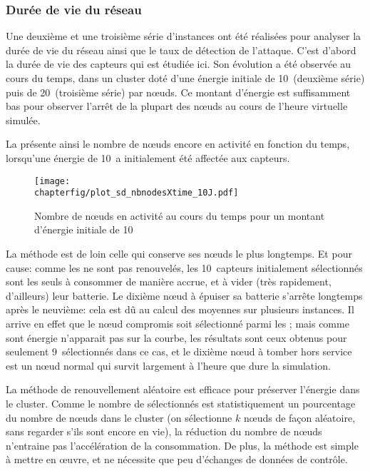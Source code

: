         \subsubsection{Durée de vie du réseau}
Une deuxième et une troisième série d'instances ont été réalisées pour analyser la durée de vie du réseau ainsi que le taux de détection de l'attaque.
C'est d'abord la durée de vie des capteurs qui est étudiée ici.
Son évolution a été observée au cours du temps, dans un cluster doté d'une énergie initiale de 10~\joule (deuxième série) puis de 20~\joule (troisième série) par nœuds.
Ce montant d'énergie est suffisamment bas pour observer l'arrêt de la plupart des nœuds au cours de l'heure virtuelle simulée.

La  présente ainsi le nombre de nœuds encore en activité en fonction du temps, lorsqu'une énergie de 10~\joule a initialement été affectée aux capteurs.
\begin{figure}[!b]
    \centering
    \texttt{[image: \\chapterfig/plot\_sd\_nbnodesXtime\_10J.pdf]}
    \caption{Nombre de nœuds en activité au cours du temps pour un montant d'énergie initiale de 10~\joule}\label{sd:fig:nbnodes-10J}
\end{figure}
La méthode \idstat est de loin celle qui conserve ses nœuds le plus longtemps.
Et pour cause: comme les \cns ne sont pas renouvelés, les 10~capteurs initialement sélectionnés sont les seuls à consommer de manière accrue, et à vider (très rapidement, d'ailleurs) leur batterie.
Le dixième nœud à épuiser sa batterie s'arrête longtemps après le neuvième: cela est dû au calcul des moyennes sur plusieurs instances.
Il arrive en effet que le nœud compromis soit sélectionné parmi les \cns; mais comme sont énergie n'apparait pas sur la courbe, les résultats sont ceux obtenus pour seulement 9~\cns sélectionnés dans ce cas, et le dixième nœud à tomber hors service est un nœud normal qui survit largement à l'heure que dure la simulation.

La méthode de renouvellement aléatoire \idrand est efficace pour préserver l'énergie dans le cluster.
Comme le nombre de \cns sélectionnés est statistiquement un pourcentage du nombre de nœuds dans le cluster (on sélectionne $k$ nœuds de façon aléatoire, sans regarder s'ils sont encore en vie), la réduction du nombre de nœuds n'entraine pas l'accélération de la consommation.
De plus, la méthode est simple à mettre en œuvre, et ne nécessite que peu d'échanges de données de contrôle.

